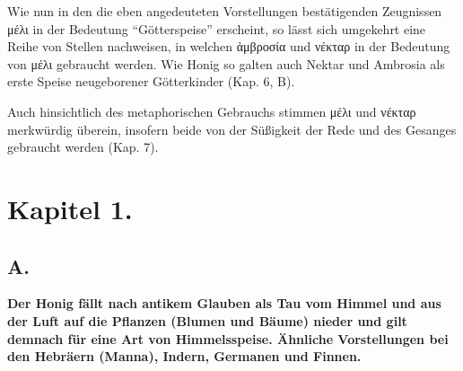 \documentclass[a4paper, 11pt, oneside]{article}
\begin{document}
Wie nun in den die eben angedeuteten Vorstellungen bestätigenden Zeugnissen μέλι in der Bedeutung "`Götterspeise"' erscheint, so lässt sich umgekehrt eine Reihe von Stellen nachweisen, in welchen ἀμβροσία und νέκταρ in der Bedeutung von μέλι gebraucht werden. Wie Honig so galten auch Nektar und Ambrosia als erste Speise neugeborener Götterkinder (Kap. 6, B).

Auch hinsichtlich des metaphorischen Gebrauchs stimmen μέλι und νέκταρ merkwürdig überein, insofern beide von der Süßigkeit der Rede und des Gesanges gebraucht werden (Kap. 7).
\clearpage
\section{Kapitel 1.}
\subsection{A.}
\begin{center}
\textbf{Der Honig fällt nach antikem Glauben als Tau vom Himmel und aus der Luft auf die Pflanzen (Blumen und Bäume) nieder und gilt demnach für eine Art von Himmelsspeise. Ähnliche Vorstellungen bei den Hebräern (Manna), Indern, Germanen und Finnen.}
\end{center}
\end{document}
